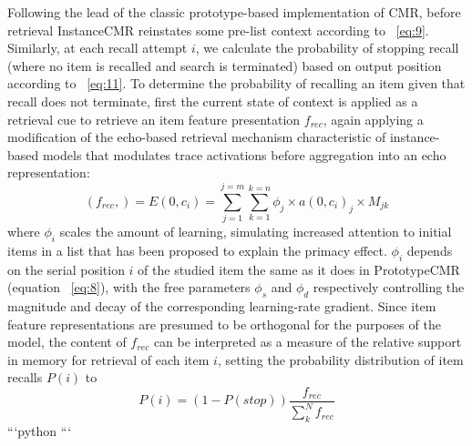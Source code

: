 {}\markdownRendererInterblockSeparator
{}Following the lead of the classic prototype-based implementation of CMR, before retrieval InstanceCMR reinstates some pre-list context according to ~\ref{eq:9}. Similarly, at each recall attempt $i$, we calculate the probability of stopping recall (where no item is recalled and search is terminated) based on output position according to ~\ref{eq:11}.\markdownRendererInterblockSeparator
{}To determine the probability of recalling an item given that recall does not terminate, first the current state of context is applied as a retrieval cue to retrieve an item feature presentation $f_{rec}$, again applying a modification of the echo-based retrieval mechanism characteristic of instance-based models that modulates trace activations before aggregation into an echo representation:\markdownRendererInterblockSeparator
{}\begin{equation} \label{eq:20} (f_{rec},) = E(0, c_i) = \sum^{j=m}_{j=1}\sum^{k=n}_{k=1} {\phi}_j \times a(0, c_i)_j \times M_{jk} \end{equation}\markdownRendererInterblockSeparator
{}where ${\phi}_i$ scales the amount of learning, simulating increased attention to initial items in a list that has been proposed to explain the primacy effect. ${\phi}_i$ depends on the serial position $i$ of the studied item the same as it does in PrototypeCMR (equation ~\ref{eq:8}), with the free parameters ${\phi}_s$ and ${\phi}_d$ respectively controlling the magnitude and decay of the corresponding learning-rate gradient.\markdownRendererInterblockSeparator
{}Since item feature representations are presumed to be orthogonal for the purposes of the model, the content of $f_{rec}$ can be interpreted as a measure of the relative support in memory for retrieval of each item $i$, setting the probability distribution of item recalls $P(i)$ to \markdownRendererInterblockSeparator
{}\begin{equation} \label{eq:21} P(i) = (1-P(stop))\frac{f_{rec}}{\sum_{k}^{N}f_{rec}} \end{equation}\markdownRendererInterblockSeparator
{}```python\markdownRendererInterblockSeparator
{}```\relax